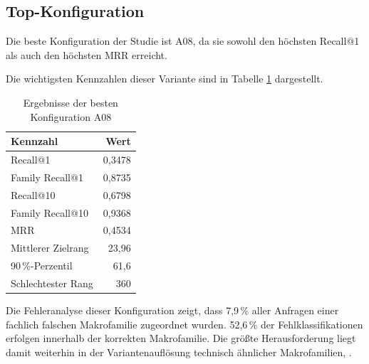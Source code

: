 \subsection{Top-Konfiguration}

Die beste Konfiguration der Studie ist A08, da sie sowohl den höchsten Recall@1 als auch den höchsten MRR erreicht\parencite{LTR_Configuration_Test_Series}.

Die wichtigsten Kennzahlen dieser Variante sind in Tabelle \ref{tab:a08_best} dargestellt. 

\begin{table}[H] 
    \centering 
    \caption{Ergebnisse der besten Konfiguration A08} 
    \label{tab:a08_best} 
    \begin{tabular}{lr} 
        \toprule 
        \textbf{Kennzahl} & \textbf{Wert} \\ 
        \midrule Recall@1 & 0,3478 \\ 
        Family Recall@1 & 0,8735 \\ 
        Recall@10 & 0,6798 \\ 
        Family Recall@10 & 0,9368 \\
        MRR & 0,4534 \\ 
        Mittlerer Zielrang & 23,96 \\ 
        90\,\%-Perzentil & 61,6 \\ 
        Schlechtester Rang & 360 \\ 
        \bottomrule 
    \end{tabular} 
\end{table}

Die Fehleranalyse dieser Konfiguration zeigt, dass 7,9\,\% aller Anfragen einer fachlich falschen Makrofamilie zugeordnet wurden.
52,6\,\% der Fehlklassifikationen erfolgen innerhalb der korrekten Makrofamilie. 
Die größte Herausforderung liegt damit weiterhin in der Variantenauflösung technisch ähnlicher Makrofamilien, \parencite{LTR_Configuration_Test_Series}.

